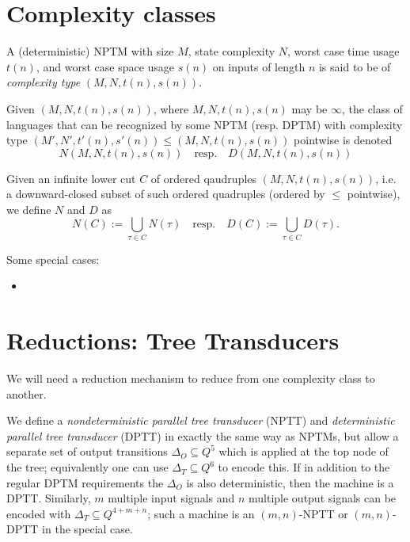 \documentclass{article}
\begin{document}
\section{Complexity classes}

\begin{definition}
A (deterministic) NPTM with size $M$, state complexity $N$, worst case time usage $t(n)$, and worst case space usage $s(n)$ on inputs of length $n$ is said to be of \emph{complexity type} $(M, N, t(n), s(n))$.

Given $(M, N, t(n), s(n))$, where $M, N, t(n), s(n)$ may be $\infty$, the class of languages that can be recognized by some NPTM (resp. DPTM) with complexity type $(M', N', t'(n), s'(n)) \le (M, N, t(n), s(n))$ pointwise is denoted
\[
N(M, N, t(n), s(n)) \quad \text{resp.} \quad D(M, N, t(n), s(n))
\]

Given an infinite lower cut $C$ of ordered qaudruples $(M, N, t(n), s(n))$,
i.e. a downward-closed subset of such ordered quadruples (ordered by $\le$ pointwise), we define $N$ and $D$ as
\[
N(C) := \bigcup_{\tau \in C} N(\tau) \quad \text{resp.} \quad D(C) := \bigcup_{\tau \in C} D(\tau).
\]
\end{definition}

\begin{definition}
Some special cases:
\begin{itemize}
\item {}
\end{itemize}

\end{definition}

\section{Reductions: Tree Transducers}

We will need a reduction mechanism to reduce from one complexity class to another.

We define a
\emph{nondeterministic parallel tree transducer} (NPTT) and \emph{deterministic parallel tree transducer} (DPTT) in exactly the same way as NPTMs, but
allow a separate set of output transitions $\Delta_O \subseteq Q^5$ which is applied at the top node of the tree; equivalently one can use $\Delta_T \subseteq Q^6$ to encode this.
If in addition to the regular DPTM requirements the $\Delta_O$ is also deterministic, then the machine is a DPTT.
Similarly, $m$ multiple input signals and $n$ multiple output signals can be encoded with $\Delta_T \subseteq Q^{4 + m + n}$; such a machine is an $(m, n)$-NPTT or $(m, n)$-DPTT in the special case.
\end{document}
